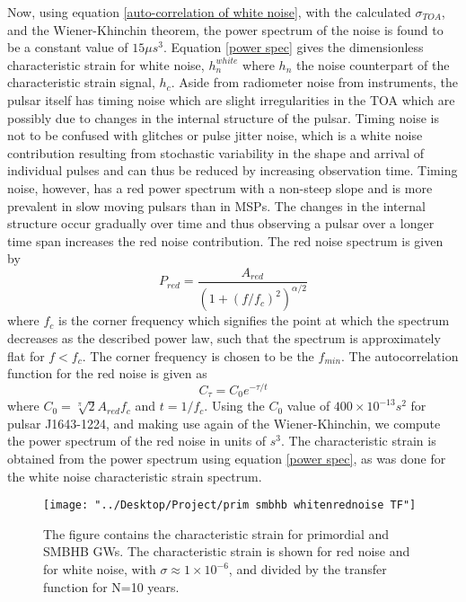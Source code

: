 \documentclass[12pt]{article}
\begin{document}
	Now, using equation \ref{auto-correlation of white noise}, with the calculated $\sigma_{TOA}$, and the Wiener-Khinchin theorem, the power spectrum of the noise is found to be a constant value of $15 \mu s^3$. Equation \ref{power spec} gives the dimensionless characteristic strain for white noise, $h_{n}^{white}$ where $h_{n}$ the noise counterpart of the characteristic strain signal, $h_{c}$. Aside from radiometer noise from instruments, the pulsar itself has timing noise which are slight irregularities in the TOA which are possibly due to changes in the internal structure of the pulsar. Timing noise is not to be confused with glitches or pulse jitter noise, which is a white noise contribution resulting from stochastic variability in the shape and arrival of individual pulses and can thus be reduced by increasing observation time. Timing noise, however, has a red power spectrum with a non-steep slope and is more prevalent in slow moving pulsars than in MSPs. The changes in the internal structure occur gradually over time and thus observing a pulsar over a longer time span increases the red noise contribution. The red noise spectrum is given by
	\begin{equation}
	P_{red}=\frac{A_{red}}{{(1+{(f/f_c)}^2)}^{\alpha/2}}
	\end{equation}
	where $f_{c}$ is the corner frequency which signifies the point at which the spectrum decreases as the described power law, such that the spectrum is approximately flat for $f<f_{c}$. The corner frequency is chosen to be the $f_{min}$.
	The autocorrelation function for the red noise is given as
	\begin{equation}\label{autocorr for red noise}
	C_{\tau}=C_0 e^{-\tau/t}
	\end{equation}
	where $C_0=\sqrt[\pi]{2}A_{red}f_{c}$ and $t=1/f_{c}$. Using the $C_0$ value of $400 \times 10^{-13} s^2$ for pulsar J1643-1224, and making use again of the Wiener-Khinchin, we compute the power spectrum of the red noise in units of $s^3$. The characteristic strain is obtained from the power spectrum using equation \ref{power spec}, as was done for the white noise characteristic strain spectrum.
\begin{figure}[th!]
	\texttt{[image: "../Desktop/Project/prim smbhb whitenrednoise TF"]}
	\caption{\label{fig:prim_smbhb_whitenrednoise_TF.png} The figure contains the characteristic strain for primordial and SMBHB GWs. The characteristic strain is shown for red noise and for white noise, with $\sigma \approx 1 \times 10^{-6}$, and divided by the transfer function for N=10 years.}
	\label{fig:prim-smbhb-whitenrednoise-tf}
\end{figure}
\end{document}
